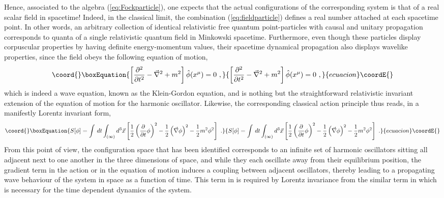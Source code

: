\documentclass[a4paper,11pt]{article}
\begin{document}
Hence, associated to the algebra (\ref{eq:Fockparticle}), one expects
that the actual con\-fi\-gu\-ra\-tions of the corresponding system is that
of a real scalar field in spacetime! Indeed, in the classical limit,
the combination (\ref{eq:fieldparticle}) defines a real number \coordHE{}
attached at each spacetime point. In other words, an arbitrary collection 
of identical relativistic free quantum point-particles with causal and 
unitary propagation corresponds to quanta of a single relativistic quantum 
field in Minkowski spacetime. Furthermore, even though these particles 
display corpuscular properties by having definite energy-momentum values, 
their spacetime dynamical propagation also displays wavelike properties, 
since the field obeys the following equation of motion,
\begin{equation}\coord{}\boxEquation{
\left[\frac{\partial^2}{\partial t^2}-\vec{\nabla}^2+m^2\right]
\hat{\phi}(x^\mu)=0\ ,
}{
\left[\frac{\partial^2}{\partial t^2}-\vec{\nabla}^2+m^2\right]
\hat{\phi}(x^\mu)=0\ ,
}{ecuacion}\coordE{}\end{equation}
which is indeed a wave equation, known as the Klein-Gordon equation,
and is nothing but the straightforward relativistic invariant extension
of the equation of motion for the harmonic oscillator. Likewise, the
corresponding classical action principle thus reads, in a manifestly Lorentz
invariant form,
\begin{equation}\coord{}\boxEquation{
S[\phi]=\int\,dt\int_{(\infty)}d^3\vec{x}
\left[\frac{1}{2}\left(\frac{\partial}{\partial t}\phi\right)^2-
\frac{1}{2}\left(\vec{\nabla}\phi\right)^2-\frac{1}{2}m^2\phi^2\right]\ .
}{
S[\phi]=\int\,dt\int_{(\infty)}d^3\vec{x}
\left[\frac{1}{2}\left(\frac{\partial}{\partial t}\phi\right)^2-
\frac{1}{2}\left(\vec{\nabla}\phi\right)^2-\frac{1}{2}m^2\phi^2\right]\ .
}{ecuacion}\coordE{}\end{equation}
From this point of view, the configuration space that has been
identified corresponds to an infinite set of harmonic oscillators sitting
all adjacent next to one another in the three dimensions of space, 
and while they each oscillate away from their equilibrium position, 
the gradient term \myHighlight{$\vec{\nabla}\phi$}\coordHE{} in the action or in the equation of 
motion induces a coupling between adjacent oscillators, thereby leading to a 
propagating wave behaviour of the system in space as a function of time. 
This term in \myHighlight{$\vec{\nabla}\phi$}\coordHE{} is required by Lorentz invariance
from the similar term in \coordHE{} which is necessary
for the time dependent dynamics of the system.
\end{document}
